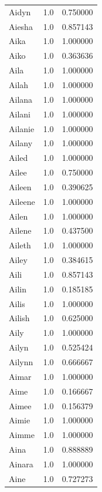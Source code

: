 \documentclass[
  letterpaper,
  DIV=11,
  numbers=noendperiod]{scrreprt}
\begin{document}
\begin{tabular}{lrr}
Aidyn           &   1.0 &   0.750000 \\
Aiesha          &   1.0 &   0.857143 \\
Aika            &   1.0 &   1.000000 \\
Aiko            &   1.0 &   0.363636 \\
Aila            &   1.0 &   1.000000 \\
Ailah           &   1.0 &   1.000000 \\
Ailana          &   1.0 &   1.000000 \\
Ailani          &   1.0 &   1.000000 \\
Ailanie         &   1.0 &   1.000000 \\
Ailany          &   1.0 &   1.000000 \\
Ailed           &   1.0 &   1.000000 \\
Ailee           &   1.0 &   0.750000 \\
Aileen          &   1.0 &   0.390625 \\
Aileene         &   1.0 &   1.000000 \\
Ailen           &   1.0 &   1.000000 \\
Ailene          &   1.0 &   0.437500 \\
Aileth          &   1.0 &   1.000000 \\
Ailey           &   1.0 &   0.384615 \\
Aili            &   1.0 &   0.857143 \\
Ailin           &   1.0 &   0.185185 \\
Ailis           &   1.0 &   1.000000 \\
Ailish          &   1.0 &   0.625000 \\
Aily            &   1.0 &   1.000000 \\
Ailyn           &   1.0 &   0.525424 \\
Ailynn          &   1.0 &   0.666667 \\
Aimar           &   1.0 &   1.000000 \\
Aime            &   1.0 &   0.166667 \\
Aimee           &   1.0 &   0.156379 \\
Aimie           &   1.0 &   1.000000 \\
Aimme           &   1.0 &   1.000000 \\
Aina            &   1.0 &   0.888889 \\
Ainara          &   1.0 &   1.000000 \\
Aine            &   1.0 &   0.727273 \\

\end{tabular}
\end{document}
